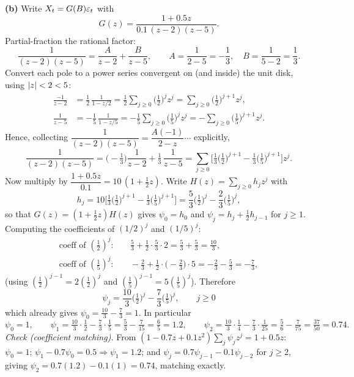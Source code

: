 \documentclass[11pt]{article}
\begin{document}
\textbf{(b)} Write $X_t=G(B)\varepsilon_t$ with
\[
G(z)=\frac{1+0.5z}{0.1\,(z-2)(z-5)} .
\]
Partial-fraction the rational factor:
\[
\frac{1}{(z-2)(z-5)}=\frac{A}{z-2}+\frac{B}{z-5},\qquad
A=\frac{1}{2-5}=-\frac13,\quad B=\frac{1}{5-2}=\frac13 .
\]
Convert each pole to a power series convergent on (and inside) the unit disk, using $\left\lvert z \right\rvert<2<5$:
\[
\begin{aligned}
\frac{-1}{z-2}&=\frac{1}{2}\,\frac{1}{1-z/2}=\frac12\sum_{j\ge0}\Big(\tfrac12\Big)^{j}z^{j}
=\sum_{j\ge0}\Big(\tfrac12\Big)^{j+1}z^{j},\\
\frac{1}{z-5}&=-\frac{1}{5}\,\frac{1}{1-z/5}=-\frac15\sum_{j\ge0}\Big(\tfrac15\Big)^{j}z^{j}
=-\sum_{j\ge0}\Big(\tfrac15\Big)^{j+1}z^{j}.
\end{aligned}
\]
Hence, collecting $\dfrac{1}{(z-2)(z-5)}=\dfrac{A(-1)}{2-z}\cdots$ explicitly,
\[
\frac{1}{(z-2)(z-5)}
=\Big(-\tfrac13\Big)\frac{1}{z-2}+\tfrac13\,\frac{1}{z-5}
=\sum_{j\ge0}\Big[\tfrac13\Big(\tfrac12\Big)^{j+1}-\tfrac13\Big(\tfrac15\Big)^{j+1}\Big]z^{j}.
\]
Now multiply by $\dfrac{1+0.5z}{0.1}=10\,(1+\tfrac12 z)$. Write $H(z)=\sum_{j\ge0}h_j z^j$ with
\[
h_j=10\Big[\tfrac13\Big(\tfrac12\Big)^{j+1}-\tfrac13\Big(\tfrac15\Big)^{j+1}\Big]
=\frac{5}{3}\Big(\tfrac12\Big)^{j}-\frac{2}{3}\Big(\tfrac15\Big)^{j},
\]
so that $G(z)=(1+\tfrac12 z)H(z)$ gives $\psi_0=h_0$ and $\psi_j=h_j+\tfrac12 h_{j-1}$ for $j\ge1$. Computing the coefficients of $(1/2)^j$ and $(1/5)^j$:
\[
\begin{aligned}
\text{coeff of }(\tfrac12)^j:&\quad \tfrac53+\tfrac12\cdot\tfrac53\cdot 2=\tfrac53+\tfrac53=\tfrac{10}{3},\\
\text{coeff of }(\tfrac15)^j:&\quad -\tfrac23+\tfrac12\cdot\big(-\tfrac23\big)\cdot 5=-\tfrac23-\tfrac53=-\tfrac73,
\end{aligned}
\]
(using $(\tfrac12)^{j-1}=2(\tfrac12)^j$ and $(\tfrac15)^{j-1}=5(\tfrac15)^j$). Therefore
\[
\boxed{\;\psi_j=\frac{10}{3}\Big(\tfrac12\Big)^{j}-\frac{7}{3}\Big(\tfrac15\Big)^{j},\qquad j\ge0\;}
\]
which already gives $\psi_0=\tfrac{10}{3}-\tfrac73=1$. In particular
\[
\psi_0=1,\qquad
\psi_1=\tfrac{10}{3}\cdot\tfrac12-\tfrac73\cdot\tfrac15=\tfrac53-\tfrac{7}{15}=\tfrac{6}{5}=1.2,
\qquad
\psi_2=\tfrac{10}{3}\cdot\tfrac14-\tfrac73\cdot\tfrac1{25}=\tfrac56-\tfrac{7}{75}=\tfrac{37}{50}=0.74 .
\]
\textit{Check (coefficient matching).} From $(1-0.7z+0.1z^2)\sum_j\psi_j z^j=1+0.5z$: $\psi_0=1$; $\psi_1-0.7\psi_0=0.5\Rightarrow\psi_1=1.2$; and $\psi_j=0.7\psi_{j-1}-0.1\psi_{j-2}$ for $j\ge2$, giving $\psi_2=0.7(1.2)-0.1(1)=0.74$, matching exactly.
\end{document}
